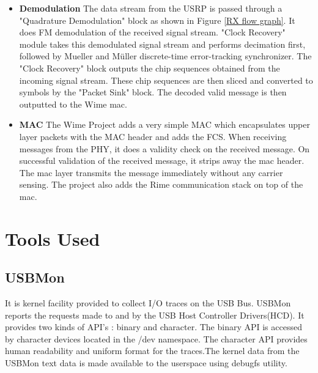 \begin{itemize}
\item{\textbf{Demodulation} The data stream from the USRP is passed through a "Quadrature Demodulation" block as shown in Figure \ref{RX flow graph}.
It does FM demodulation of the received signal stream.
"Clock Recovery" module takes this demodulated signal stream and performs  decimation first, followed by  Mueller and Müller discrete-time error-tracking synchronizer.
The "Clock Recovery" block outputs the chip sequences obtained from the incoming signal stream.
These chip sequences are then sliced and converted to symbols by the "Packet Sink" block.
The decoded valid message is then outputted to the Wime \ac{mac}.}

\item{\textbf{MAC} The Wime Project adds a very simple MAC which encapsulates upper layer packets with the MAC header and adds the \ac{FCS}.
When receiving messages from the \ac{PHY}, it does a validity check on the received message.
On successful validation of the received message, it strips away the \ac{mac} header.
The \ac{mac} layer transmits the message immediately without any carrier sensing.
The project also adds the Rime communication stack on top of the \ac{mac}.}
\end{itemize}

\section{Tools Used}
\subsection{USBMon}
It is kernel facility provided to collect I/O traces on the USB Bus\cite{_usbmon}. USBMon reports the requests made to and by the USB Host Controller Drivers(HCD). It provides two kinds of API's : binary and character. The binary API is accessed by character devices located in the /dev namespace. The character API provides human readability and uniform format for the traces.The kernel data from the USBMon text data is made available to the userspace using debugfs\cite{_debugfs} utility.

